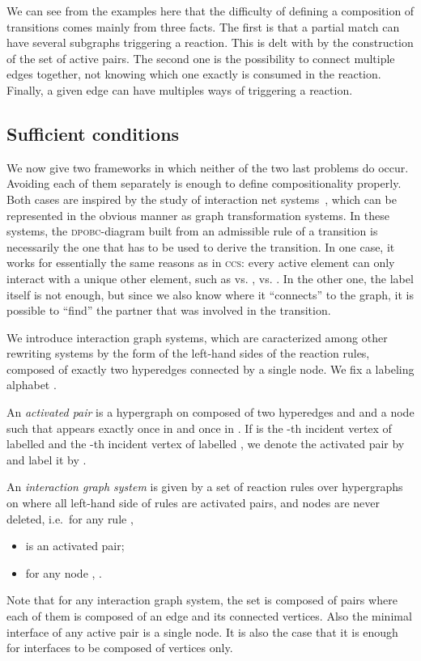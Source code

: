 We can see from the examples here that the difficulty of defining a composition of transitions comes mainly from three facts. 
The first is that a partial match can have several subgraphs triggering a reaction. 
This is delt with by the construction of the set of active pairs.
The second one is the possibility to connect multiple edges together, not knowing which one exactly is consumed in the reaction. 
Finally,  a given edge can have multiples ways of triggering a reaction.

\subsection{Sufficient conditions}
We now give two frameworks in which neither of the two last problems do occur. 
Avoiding each of them separately is enough to define compositionality properly.
Both cases  are inspired by the study of interaction net systems~\cite{Laf95,EhrReg06,MazzaPhd06},
which can be represented in the 
{}obvious{}    manner as graph transformation systems. 
In these systems, 
the \textsc{dpobc}-diagram built from an admissible rule of a transition is necessarily the one that has to be used to derive the transition. 
In one case, 
it works for essentially the same reasons as in \textsc{ccs}: 
every active element can only interact with a unique other element, 
such as  vs. ,  vs. .
In the other one, 
the label itself is not enough, 
but since we also know where it ``connects'' to the graph, 
it is possible to ``find'' the partner that was involved in the transition.

We introduce interaction graph systems, 
which are caracterized among other rewriting systems by the form of the left-hand sides of the reaction rules, 
composed of exactly two hyperedges connected by a single node.
We fix a labeling alphabet .
\begin{definition}
  An \emph{activated pair} is a hypergraph  on  composed of two hyperedges  and  and a node   such that  appears exactly once in  and once in .
  If  is the -th incident vertex of  labelled  and the -th incident vertex of  labelled , we denote the activated pair by  and label it by .

  An \emph{interaction graph system}  is given by a set of reaction rules  over hypergraphs on  
  where all left-hand side of rules are activated pairs, 
  and  nodes are never deleted, 
  i.e.\ for any rule , 
  \begin{itemize}
    \item  is an activated pair;
    \item for any node , .
  \end{itemize}
  \label{def:interSys}
\end{definition}
Note that for any interaction graph system, 
the set  is composed of pairs  where each of them is composed of an edge and its connected vertices.
Also the minimal interface of any active pair  is a single node.
It is also the case that it is enough for interfaces to be composed of vertices only.




